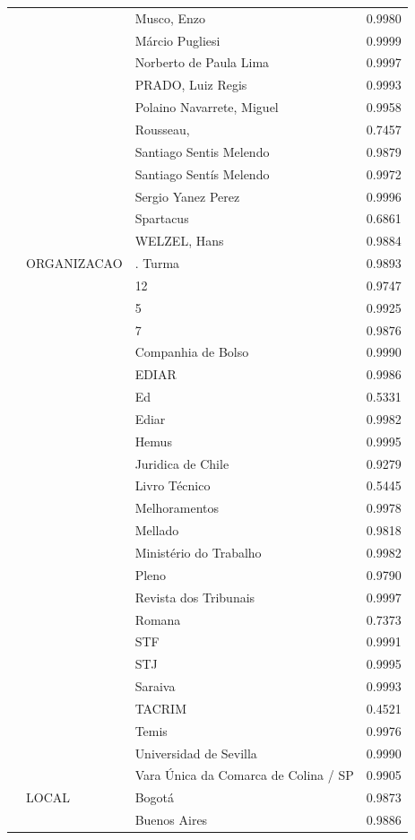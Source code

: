 \begin{table}
\begin{tabular}{llp{6cm}r}
 &  & Musco, Enzo & 0.9980 \\
 &  & Márcio Pugliesi & 0.9999 \\
 &  & Norberto de Paula Lima & 0.9997 \\
 &  & PRADO, Luiz Regis & 0.9993 \\
 &  & Polaino Navarrete, Miguel & 0.9958 \\
 &  & Rousseau, & 0.7457 \\
 &  & Santiago Sentis Melendo & 0.9879 \\
 &  & Santiago Sentís Melendo & 0.9972 \\
 &  & Sergio Yanez Perez & 0.9996 \\
 &  & Spartacus & 0.6861 \\
 &  & WELZEL, Hans & 0.9884 \\
 & ORGANIZACAO & . Turma & 0.9893 \\
 &  & 12 & 0.9747 \\
 &  & 5 & 0.9925 \\
 &  & 7 & 0.9876 \\
 &  & Companhia de Bolso & 0.9990 \\
 &  & EDIAR & 0.9986 \\
 &  & Ed & 0.5331 \\
 &  & Ediar & 0.9982 \\
 &  & Hemus & 0.9995 \\
 &  & Juridica de Chile & 0.9279 \\
 &  & Livro Técnico & 0.5445 \\
 &  & Melhoramentos & 0.9978 \\
 &  & Mellado & 0.9818 \\
 &  & Ministério do Trabalho & 0.9982 \\
 &  & Pleno & 0.9790 \\
 &  & Revista dos Tribunais & 0.9997 \\
 &  & Romana & 0.7373 \\
 &  & STF & 0.9991 \\
 &  & STJ & 0.9995 \\
 &  & Saraiva & 0.9993 \\
 &  & TACRIM & 0.4521 \\
 &  & Temis & 0.9976 \\
 &  & Universidad de Sevilla & 0.9990 \\
 &  & Vara Única da Comarca de Colina / SP & 0.9905 \\
 & LOCAL & Bogotá & 0.9873 \\
 &  & Buenos Aires & 0.9886 \\

\end{tabular}
\end{table}

